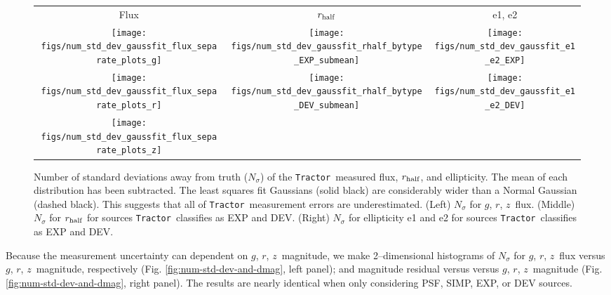 \documentclass[a4paper,fleqn,usenatbib]{mnras}
\newcommand{\rhalf}{r_{\rm{half}}}
\newcommand{\gb}{$g$}
\newcommand{\rband}{$r$}
\newcommand{\zb}{$z$}
\newcommand{\tractor}{{\tt Tractor}}
\begin{document}
\begin{figure*}
\begin{center}
\begin{tabular}{ccc}
      Flux & $\rhalf$ & e1, e2 \\
      \texttt{[image: figs/num\_std\_dev\_gaussfit\_flux\_separate\_plots\_g]} &
      \texttt{[image: figs/num\_std\_dev\_gaussfit\_rhalf\_bytype\_EXP\_submean]} &
      \texttt{[image: figs/num\_std\_dev\_gaussfit\_e1\_e2\_EXP]} 
      \\
      \texttt{[image: figs/num\_std\_dev\_gaussfit\_flux\_separate\_plots\_r]} &
      \texttt{[image: figs/num\_std\_dev\_gaussfit\_rhalf\_bytype\_DEV\_submean]} &
      \texttt{[image: figs/num\_std\_dev\_gaussfit\_e1\_e2\_DEV]} 
      \\
      \texttt{[image: figs/num\_std\_dev\_gaussfit\_flux\_separate\_plots\_z]} 
      \\
\end{tabular}
\end{center}
\caption{Number of standard deviations away from truth ($N_\sigma$) of the \tractor\, measured flux, $\rhalf$, and ellipticity. The mean of each distribution has been subtracted. The least squares fit Gaussians (solid black) are considerably wider than a Normal Gaussian (dashed black). This suggests that all of \tractor\, measurement errors are underestimated. (Left) $N_\sigma$  for \gb, \rband, \zb\, flux. (Middle) $N_\sigma$ for $\rhalf$ for sources \tractor\, classifies as EXP and DEV. (Right) $N_\sigma$ for ellipticity e1 and e2 for sources \tractor\, classifies as EXP and DEV. 
    \label{fig:tractor-uncertainty}}
\end{figure*}

Because the measurement uncertainty can dependent on \gb, \rband, \zb\, magnitude, we make 2--dimensional histograms of $N_\sigma$ for \gb, \rband, \zb\, flux versus \gb, \rband, \zb\, magnitude, respectively (Fig. \ref{fig:num-std-dev-and-dmag}, left panel); and magnitude residual versus versus \gb, \rband, \zb\, magnitude (Fig. \ref{fig:num-std-dev-and-dmag}, right panel). The results are nearly identical when only considering PSF, SIMP, EXP, or DEV sources.
\end{document}
